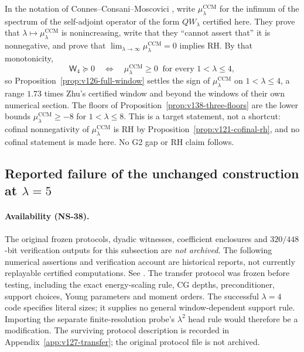 \documentclass[11pt]{article}
\theoremstyle{remark}
\begin{document}
In the notation of Connes--Consani--Moscovici
\cite[Corollaries~3.7--3.8]{ConnesConsaniMoscovici2025}, write
$\mu^{\mathrm{CCM}}_\lambda$ for the infimum of the spectrum of the
self-adjoint operator of the form $QW_\lambda$ certified here. They
prove that $\lambda\mapsto\mu^{\mathrm{CCM}}_\lambda$ is nonincreasing,
write that they ``cannot assert that'' it is nonnegative, and prove
that $\lim_{\lambda\to\infty}\mu^{\mathrm{CCM}}_\lambda=0$ implies RH.
By that monotonicity,
\[
 \mathsf W_4\succeq0
 \quad\Longleftrightarrow\quad
 \mu^{\mathrm{CCM}}_\lambda\ge0\ \text{ for every }1<\lambda\le4,
\]
so Proposition~\ref{prop:v126-full-window} settles the sign of
$\mu^{\mathrm{CCM}}_\lambda$ on $1<\lambda\le4$, a range $1.73$ times
Zhu's certified window and beyond the windows of their own numerical
section. The floors of Proposition~\ref{prop:v138-three-floors} are the
lower bounds $\mu^{\mathrm{CCM}}_\lambda\ge-8$ for $1<\lambda\le8$.
This is a target statement, not a shortcut: cofinal nonnegativity of
$\mu^{\mathrm{CCM}}_\lambda$ is RH by
Proposition~\ref{prop:v121-cofinal-rh}, and no cofinal statement is
made here. No G2 gap or RH claim follows.



\subsection*{Reported failure of the unchanged construction at $\lambda=5$}
\label{sec:v127-transfer}
\paragraph{Availability (NS-38).} The original frozen protocols, dyadic
witnesses, coefficient enclosures and $320/448$-bit verification outputs
for this subsection are \emph{not archived}. The following numerical
assertions and verification account are historical reports, not currently
replayable certified computations. See .
The transfer protocol was frozen before testing, including the exact
energy-scaling rule, CG depths, preconditioner, support choices, Young
parameters and moment orders. The successful $\lambda=4$ code specifies
literal sizes; it supplies no general window-dependent support rule.
Importing the separate finite-resolution probe's $\lambda^2$ head rule
would therefore be a modification. The surviving protocol description is recorded in
Appendix~\ref{app:v127-transfer}; the original protocol file is not archived.
\end{document}
